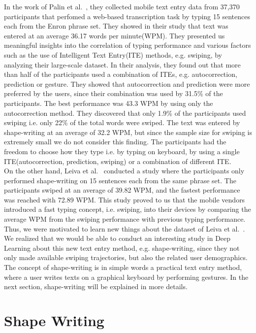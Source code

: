 \documentclass[11pt,oneside,a4paper,openright]{book}
\begin{document}
In the work of Palin et al.~\cite{Palin19}, they collected mobile text entry data from 37,370 participants that perfomed a web-based transcription task by typing 15 sentences each from the Enron phrase set. They showed in their study that text was entered at an average 36.17 words per minute(WPM). They presented us meaningful insights into the correlation of typing performance and various factors such as the use of Intelligent Text Entry(ITE) methods, e.g. swiping, by analyzing their large-scale dataset. In their analysis, they found out that more than half of the participants used a combination of ITEs, e.g. autocorrection, prediction or gesture. They showed that autocorrection and prediction were more preferred by the users, since their combination was used by 31.5\% of the participants. The best performance was 43.3 WPM by using only the autocorrection method. They discovered that only 1.9\% of the participants used swiping i.e. only 22\% of the total words were swiped.  The text was entered by shape-writing at an average of 32.2 WPM, but since the sample size for swiping is extremely small we do not consider this finding. The participants had the freedom to choose how they type i.e. by typing on keyboard, by using a single ITE(autocorrection, prediction, swiping) or a combination of different ITE.\\

On the other hand, Leiva et al.~\cite{Leiva21_swipe} conducted a study where the participants only performed shape-writing on 15 sentences each from the same phrase set. The participants swiped at an average of 39.82 WPM, and the fastest performance was reached with 72.89 WPM. This study proved to us that the mobile vendors introduced a fast typing concept, i.e. swiping, into their devices by comparing the average WPM from the swiping performance with previous typing performance. Thus, we were motivated to learn new things about the dataset of Leiva et al.~\cite{Leiva21_swipe}. We realized that we would be able to conduct an interesting study in Deep Learning about this new text entry method, e.g. shape-writing, since they not only made available swiping trajectories, but also the related user demographics. The concept of shape-writing is in simple words a practical text entry method, where a user writes texts on a graphical keyboard by performing gestures. In the next section, shape-writing will be explained in more details.  \newpage



\section{Shape Writing}
\end{document}
